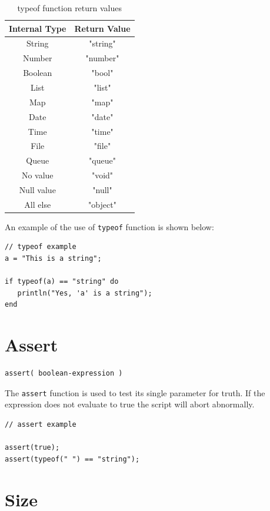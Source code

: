\begin{table}[h!]
\centering
\begin{tabular} { | c | c | }
\hline
Internal Type     &  Return Value \\
\hline
String & "string" \\
Number &"number" \\
Boolean & "bool" \\
List & "list" \\
Map & "map" \\
Date & "date" \\
Time & "time" \\
File & "file" \\
Queue & "queue" \\
No value & "void" \\
Null value & "null" \\
All else & "object" \\
\hline
\end{tabular}
\label{tab:TypeOf}
\caption{typeof function return values}
\end{table}

An example of the use of \verb+typeof+ function is shown below:

\begin{lstlisting}[caption={Typeof example}]
// typeof example
a = "This is a string";

if typeof(a) == "string" do
   println("Yes, 'a' is a string");
end

\end{lstlisting}

\section{Assert}
\begin{verbatim}
assert( boolean-expression )
\end{verbatim}

The \verb+assert+ function is used to test its single parameter for truth. If the expression does not evaluate to true the \Reflex script will abort abnormally.

\begin{lstlisting}[caption={Assert example}]
// assert example

assert(true);
assert(typeof(" ") == "string");

\end{lstlisting}

\section{Size}

